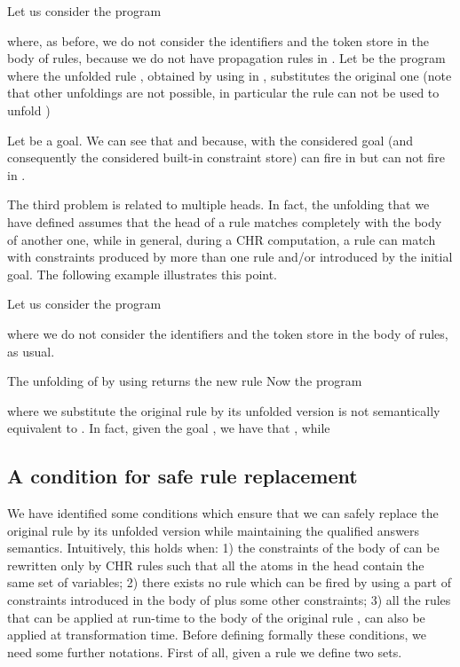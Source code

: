 \documentclass{tlp}
\begin{document}
\begin{example}\label{ex:matching}
Let us consider the program

where, as before, we do not consider the identifiers and the token store in the
body of rules, because we do not have propagation rules in .
Let  be the program where the unfolded rule
, obtained by using  in ,
substitutes the original one (note that other unfoldings are not possible, in
particular the rule  can  not be used to unfold )

Let  be a goal. We can see that
 and   because,
with the considered goal (and consequently
the considered built-in constraint store)  can fire in  but can not fire in
.





The third problem is related to multiple heads. In fact, the
unfolding that we have defined  assumes that the head of a rule
matches completely with the body of another one, while in general,
during a CHR computation, a rule can match with constraints
produced by more than one rule and/or  introduced by the initial
goal. The following example illustrates this point.

\begin{example}\label{ex:unicatesta}
Let us consider the program

where we do not consider the identifiers and the token store in
the body of rules, as usual.

The unfolding  of  by using   returns the new
rule
 Now the program

where we substitute the original rule by its  unfolded version is
not semantically equivalent to . In fact, given the goal , we have that  , while 
\end{example}



\end{example}

\subsection{A condition for safe rule replacement}

We have identified some conditions which ensure that we can safely replace the
original rule  by its unfolded version while maintaining the
qualified answers semantics. Intuitively, this holds when: 1)  the
constraints of the body of   can
 be rewritten only by CHR rules such that all the atoms in the head contain the same set of variables;
2) there exists no rule  which can be fired by using
a part of constraints introduced in the body of  plus some
other constraints; 3) all the rules that can be applied at run-time to the body of the original rule , can also be applied at
transformation time.
Before defining formally these conditions, we need some further
notations. First of all, given a rule  we define
two sets.
\end{document}
